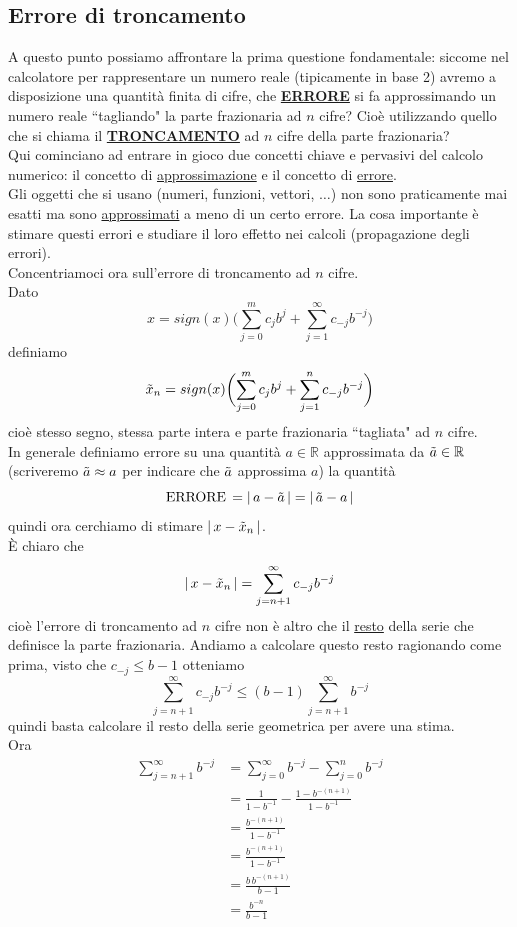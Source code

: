 \subsection{Errore di troncamento}
A questo punto possiamo affrontare la prima questione fondamentale: siccome nel calcolatore per rappresentare un numero reale (tipicamente in base 2) avremo a disposizione una quantità finita di cifre, che \uline{\textbf{ERRORE}} si fa approssimando un numero reale ``tagliando" la parte frazionaria ad $n$ cifre? Cioè utilizzando quello che si chiama il \uline{\textbf{TRONCAMENTO}} ad $n$ cifre della parte frazionaria? \\
Qui cominciano ad entrare in gioco due concetti chiave e pervasivi del calcolo numerico: il concetto di \uline{approssimazione} e il concetto di \uline{errore}. \\
Gli oggetti che si usano (numeri, funzioni, vettori, $\dotsc$) non sono praticamente mai esatti ma sono \uline{approssimati} a meno di un certo errore. La cosa importante è stimare questi errori e studiare il loro effetto nei calcoli (propagazione degli errori). \\
Concentriamoci ora sull'errore di troncamento ad $n$ cifre.\\
Dato \[ x = sign(x) \biggl( \sum_{j=0}^m c_j b^j + \sum_{j=1}^\infty c_{-j} b^{-j} \biggr) \]
definiamo \[ \Tilde{x}_n = sign(x) \biggl( \sum_{j=0}^m c_j b^j + \sum_{j=1}^n c_{-j} b^{-j} \biggr) \]
cioè stesso segno, stessa parte intera e parte frazionaria ``tagliata" ad $n$ cifre. \\
In generale definiamo errore su una quantità $a \in \mathbb{R}$ approssimata da $\Tilde{a} \in \mathbb{R}$ (scriveremo $\Tilde{a} \approx a$ per indicare che $\Tilde{a}$ approssima $a$) la quantità \[ \text{ERRORE}\,= \lvert \, a - \Tilde{a} \,\rvert = \lvert \, \Tilde{a} - a \,\rvert \]
quindi ora cerchiamo di stimare $\lvert \, x - \Tilde{x}_n \,\rvert$. \\
È chiaro che \[ \lvert \, x - \Tilde{x}_n \,\rvert = \sum_{j=n+1}^\infty c_{-j} b^{-j} \]
cioè l'errore di troncamento ad $n$ cifre non è altro che il \uline{resto} della serie che definisce la parte frazionaria. Andiamo a calcolare questo resto ragionando come prima, visto che $c_{-j} \le b - 1$ otteniamo
\[ \sum_{j=n+1}^{\infty} c_{-j}b^{-j} \le (b-1)\sum_{j=n+1}^{\infty} b^{-j} \]
quindi basta calcolare il resto della serie geometrica per avere una stima. \\
Ora
\[ \begin{split}
    \sum_{j=n+1}^{\infty} b^{-j} & = \sum_{j=0}^{\infty} b^{-j} - \sum_{j=0}^{n} b^{-j} \\
    & = \frac{1}{1 - b^{-1}} - \frac{1 - b^{-(n+1)}}{1 - b^{-1}} \\
    & = \frac{b^{-(n+1)}}{1 - b^{-1}} \\
    & = \frac{b^{-(n+1)}}{1 - b^{-1}} \\
    & = \frac{b\,b^{-(n+1)}}{b - 1} \\
    & = \frac{b^{-n}}{b - 1}
\end{split} \]
